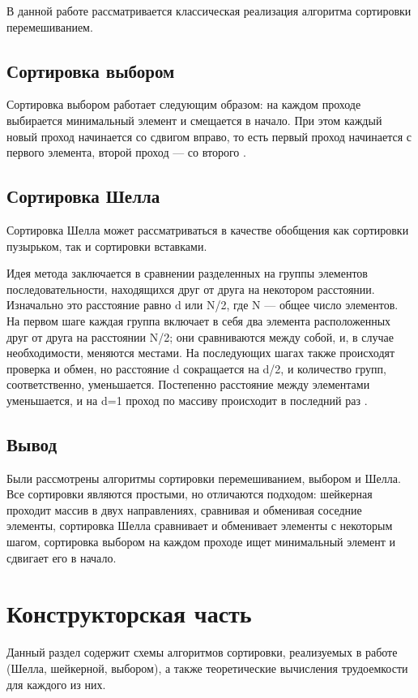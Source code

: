\documentclass[a4paper,oneside,14pt]{extreport}
\begin{document}
В данной работе рассматривается классическая реализация алгоритма сортировки перемешиванием.

\section{Сортировка выбором}
Сортировка выбором работает следующим образом: на каждом проходе выбирается минимальный элемент и смещается в начало. При этом каждый новый проход начинается со сдвигом вправо, то есть первый проход начинается с первого элемента, второй проход — со второго \cite{Selection}.

\section{Сортировка Шелла}
Сортировка Шелла может рассматриваться в качестве обобщения как сортировки пузырьком, так и сортировки вставками.

Идея метода заключается в сравнении разделенных на группы элементов последовательности, находящихся друг от друга на некотором расстоянии. Изначально это расстояние равно d или N/2, где N — общее число элементов. На первом шаге каждая группа включает в себя два элемента расположенных друг от друга на расстоянии N/2; они сравниваются между собой, и, в случае необходимости, меняются местами. На последующих шагах также происходят проверка и обмен, но расстояние d сокращается на d/2, и количество групп, соответственно, уменьшается. Постепенно расстояние между элементами уменьшается, и на d=1 проход по массиву происходит в последний раз \cite{Shell}.

\section{Вывод}
Были рассмотрены алгоритмы сортировки перемешиванием, выбором и Шелла. Все сортировки являются простыми, но отличаются подходом: шейкерная проходит массив в двух направлениях, сравнивая и обменивая соседние элементы, сортировка Шелла сравнивает и обменивает элементы с некоторым шагом, сортировка выбором на каждом проходе ищет минимальный элемент и сдвигает его в начало.

\newpage
\chapter{Конструкторская часть}
Данный раздел содержит схемы алгоритмов сортировки, реализуемых в работе (Шелла, шейкерной, выбором), а также теоретические вычисления трудоемкости для каждого из них.
\end{document}
